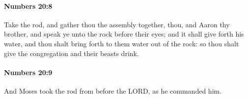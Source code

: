 		\paragraph{Numbers 20:8} %
			\label{NUMBERS-20-8}

			Take the rod, and gather thou the assembly together, thou, and Aaron thy brother, and speak ye unto the rock before their eyes; and it shall give forth his water, and thou shalt bring forth to them water out of the rock: so thou shalt give the congregation and their beasts drink.


		\paragraph{Numbers 20:9} %
			\label{NUMBERS-20-9}

			And Moses took the rod from before the LORD, as he commanded him.


